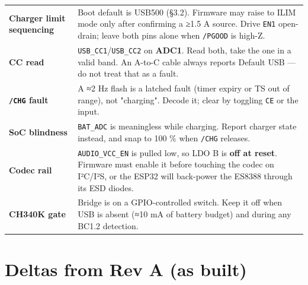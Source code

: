 \documentclass[11pt]{article}
\begin{document}
\begin{longtable}{@{}L{3.2cm} L{\dimexpr\linewidth-3.9cm}@{}}
\textbf{Charger limit sequencing} & Boot default is USB500 (§3.2). Firmware may raise to ILIM mode only after confirming a ≥1.5 A source. Drive \texttt{EN1} open-drain; leave both pins alone when \texttt{/PGOOD} is high-Z. \\
\textbf{CC read} & \texttt{USB_CC1}/\texttt{USB_CC2} on \textbf{ADC1}. Read both, take the one in a valid band. An A-to-C cable always reports Default USB — do not treat that as a fault. \\
\textbf{\texttt{/CHG} fault} & A ≈2 Hz flash is a latched fault (timer expiry or TS out of range), not "charging". Decode it; clear by toggling \texttt{CE} or the input. \\
\textbf{SoC blindness} & \texttt{BAT_ADC} is meaningless while charging. Report charger state instead, and snap to 100 \% when \texttt{/CHG} releases. \\
\textbf{Codec rail} & \texttt{AUDIO_VCC_EN} is pulled low, so LDO B is \textbf{off at reset}. Firmware must enable it before touching the codec on I²C/I²S, or the ESP32 will back-power the ES8388 through its ESD diodes. \\
\textbf{CH340K gate} & Bridge is on a GPIO-controlled switch. Keep it off when USB is absent (≈10 mA of battery budget) and during any BC1.2 detection. \\
\bottomrule
\end{longtable}
\normalsize

\section{Deltas from Rev A (as built)}
\end{document}
